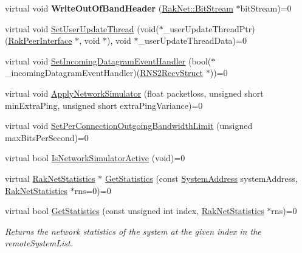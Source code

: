 \begin{DoxyCompactItemize}
\item 
\hypertarget{class_rak_net_1_1_rak_peer_interface_ac63c11416b7c9295f4a16b7d700ca60c}{virtual void {\bfseries Write\-Out\-Of\-Band\-Header} (\hyperlink{class_rak_net_1_1_bit_stream}{Rak\-Net\-::\-Bit\-Stream} $\ast$bit\-Stream)=0}\label{class_rak_net_1_1_rak_peer_interface_ac63c11416b7c9295f4a16b7d700ca60c}

\item 
virtual void \hyperlink{class_rak_net_1_1_rak_peer_interface_a0832004c529aa9a0844b61eaf1374b3c}{Set\-User\-Update\-Thread} (void($\ast$\-\_\-user\-Update\-Thread\-Ptr)(\hyperlink{class_rak_net_1_1_rak_peer_interface}{Rak\-Peer\-Interface} $\ast$, void $\ast$), void $\ast$\-\_\-user\-Update\-Thread\-Data)=0
\item 
virtual void \hyperlink{class_rak_net_1_1_rak_peer_interface_a6b70ebc4e2852362b366e8738624ec44}{Set\-Incoming\-Datagram\-Event\-Handler} (bool($\ast$\-\_\-incoming\-Datagram\-Event\-Handler)(\hyperlink{struct_rak_net_1_1_r_n_s2_recv_struct}{R\-N\-S2\-Recv\-Struct} $\ast$))=0
\item 
virtual void \hyperlink{class_rak_net_1_1_rak_peer_interface_a03910361629f5cbabe0df0612a1f2709}{Apply\-Network\-Simulator} (float packetloss, unsigned short min\-Extra\-Ping, unsigned short extra\-Ping\-Variance)=0
\item 
virtual void \hyperlink{class_rak_net_1_1_rak_peer_interface_a95daeb743853a4406182e47668c0f33b}{Set\-Per\-Connection\-Outgoing\-Bandwidth\-Limit} (unsigned max\-Bits\-Per\-Second)=0
\item 
virtual bool \hyperlink{class_rak_net_1_1_rak_peer_interface_a917c367bcba491fb243161025b6eab01}{Is\-Network\-Simulator\-Active} (void)=0
\item 
virtual \hyperlink{struct_rak_net_1_1_rak_net_statistics}{Rak\-Net\-Statistics} $\ast$ \hyperlink{class_rak_net_1_1_rak_peer_interface_a87e528130f7f0f21597a338769fe7139}{Get\-Statistics} (const \hyperlink{struct_rak_net_1_1_system_address}{System\-Address} system\-Address, \hyperlink{struct_rak_net_1_1_rak_net_statistics}{Rak\-Net\-Statistics} $\ast$rns=0)=0
\item 
virtual bool \hyperlink{class_rak_net_1_1_rak_peer_interface_a28c5bd84842962e60097512a9f6ff463}{Get\-Statistics} (const unsigned int index, \hyperlink{struct_rak_net_1_1_rak_net_statistics}{Rak\-Net\-Statistics} $\ast$rns)=0
\begin{DoxyCompactList}\small\item\em Returns the network statistics of the system at the given index in the remote\-System\-List. \end{DoxyCompactList}\item 

\end{DoxyCompactItemize}
